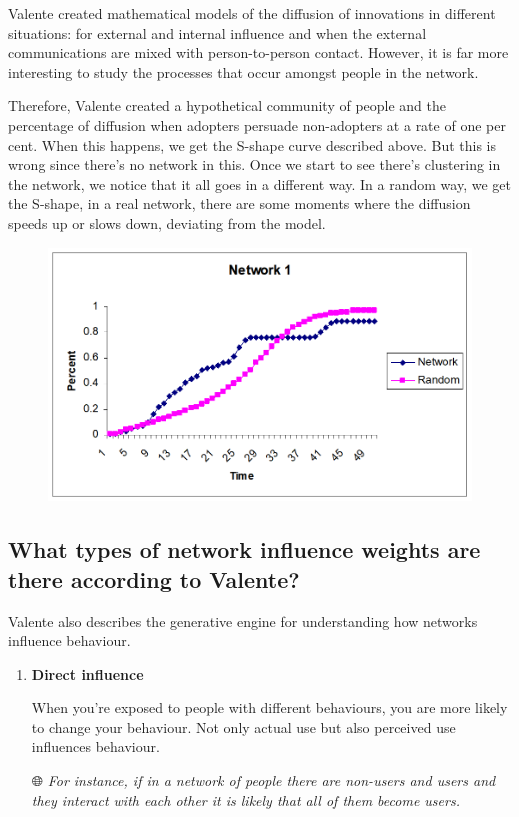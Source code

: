 \documentclass[
  notitlepage,
  onecolumn,
  openany]{book}
\begin{document}
Valente created mathematical models of the diffusion of innovations in different situations: for external and internal influence and when the external communications are mixed with person-to-person contact. However, it is far more interesting to study the processes that occur amongst people in the network.

Therefore, Valente created a hypothetical community of people and the percentage of diffusion when adopters persuade non-adopters at a rate of one per cent. When this happens, we get the S-shape curve described above. But this is wrong since there's no network in this. Once we start to see there's clustering in the network, we notice that it all goes in a different way. In a random way, we get the S-shape, in a real network, there are some moments where the diffusion speeds up or slows down, deviating from the model.

\begin{figure}[h!]

{\centering \includegraphics[width=0.5\linewidth]{images/14-Christakis and Valente/Untitled 2} 

}

\end{figure}

\hypertarget{what-types-of-network-influence-weights-are-there-according-to-valente}{%
\subsection{What types of network influence weights are there according to Valente?}\label{what-types-of-network-influence-weights-are-there-according-to-valente}}

Valente also describes the generative engine for understanding how networks influence behaviour.

\begin{enumerate}
\def\labelenumi{\arabic{enumi}.}
\item
  \textbf{Direct influence}

  When you're exposed to people with different behaviours, you are more likely to change your behaviour. Not only actual use but also perceived use influences behaviour.

  🌐 \emph{For instance, if in a network of people there are non-users and users and they interact with each other it is likely that all of them become users.}
\end{enumerate}
\end{document}
